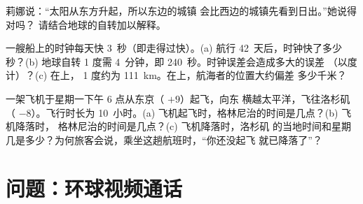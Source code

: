 \begin{exercise}[$\star\star$]\label{exo:g6:latitude-longitude:10}
莉娜说：“太阳从东方升起，所以东边的城镇
会比西边的城镇先看到日出。”她说得对吗？
请结合地球的自转加以解释。
\end{exercise}

\begin{exercise}[$\star\star\star$]\label{exo:g6:latitude-longitude:11}
一艘船上的时钟每天快 3~秒（即走得过快）。(a) 航行
42~天后，时钟快了多少秒？(b) 地球自转 1 度需
4~分钟，即 240~秒。时钟误差会造成多大的误差
（以度计）？(c) 在上， 1 度约为
\qty{111}{km}。在上，航海者的位置大约偏差
多少千米？
\end{exercise}

\begin{exercise}[$\star\star\star$]\label{exo:g6:latitude-longitude:12}
一架飞机于星期一下午 6 点从东京（ $+9$）起飞，向东
横越太平洋，飞往洛杉矶（ $-8$）。飞行时长为 10~小时。(a)
飞机起飞时，格林尼治的时间是几点？(b) 飞机降落时，
格林尼治的时间是几点？(c) 飞机降落时，洛杉矶
的当地时间和星期几是多少？为何旅客会说，乘坐这趟航班时，“你还没起飞
就已降落了”？
\end{exercise}

\section{问题：环球视频通话}

